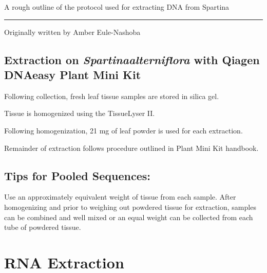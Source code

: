 \documentclass[
  letterpaper,
  DIV=11,
  numbers=noendperiod]{scrreprt}
\begin{document}
A rough outline of the protocol used for extracting DNA from Spartina

\begin{center}\rule{0.5\linewidth}{0.5pt}\end{center}

Originally written by Amber Eule-Nashoba

\hypertarget{extraction-on-spartinaalterniflora-with-qiagen-dnaeasy-plant-mini-kit}{%
\section*{\texorpdfstring{\textbf{Extraction on
\emph{Spartinaalterniflora} with Qiagen DNAeasy Plant Mini
Kit}}{Extraction on Spartinaalterniflora with Qiagen DNAeasy Plant Mini Kit}}\label{extraction-on-spartinaalterniflora-with-qiagen-dnaeasy-plant-mini-kit}}


Following collection, fresh leaf tissue samples are stored in silica
gel.

Tissue is homogenized using the TissueLyser II.

Following homogenization, 21 mg of leaf powder is used for each
extraction.

Remainder of extraction follows procedure outlined in Plant Mini Kit
handbook.

\hypertarget{tips-for-pooled-sequences}{%
\section*{\texorpdfstring{\textbf{Tips for Pooled
Sequences:}}{Tips for Pooled Sequences:}}\label{tips-for-pooled-sequences}}


Use an approximately equivalent weight of tissue from each sample. After
homogenizing and prior to weighing out powdered tissue for extraction,
samples can be combined and well mixed or an equal weight can be
collected from each tube of powdered tissue.\\

\hypertarget{rna-extraction}{%
\chapter{RNA Extraction}\label{rna-extraction}}
\end{document}
